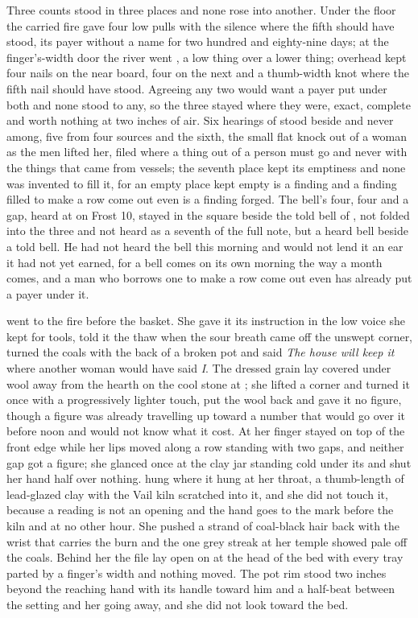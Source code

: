 Three counts stood in three places and none rose into another. Under the floor the carried fire gave four low pulls with the silence where the fifth should have stood, its payer without a name for two hundred and eighty-nine days; at the finger's-width door the river went , a low thing over a lower thing; overhead  kept four nails on the near board, four on the next and a thumb-width knot where the fifth nail should have stood. Agreeing any two would want a payer put under both and none stood to any, so the three stayed where they were, exact, complete and worth nothing at two inches of air. Six hearings of  stood beside and never among, five from four sources and the sixth, the small flat knock out of a woman as the men lifted her, filed where a thing out of a person must go and never with the things that came from vessels; the seventh place kept its emptiness and none was invented to fill it, for an empty place kept empty is a finding and a finding filled to make a row come out even is a finding forged. The bell's four, four and a gap, heard at  on Frost 10, stayed in the square beside the told bell of , not folded into the three and not heard as a seventh of the full note, but a heard bell beside a told bell. He had not heard the bell this morning and would not lend it an ear it had not yet earned, for a bell comes on its own morning the way a month comes, and a man who borrows one to make a row come out even has already put a payer under it.

 went to the fire before the basket. She gave it its instruction in the low voice she kept for tools, told it the thaw when the sour breath came off the unswept corner, turned the coals with the back of a broken pot and said \emph{The house will keep it} where another woman would have said \emph{I}. The dressed grain lay covered under wool away from the hearth on the cool stone at ; she lifted a corner and turned it once with a progressively lighter touch, put the wool back and gave it no figure, though a figure was already travelling up  toward a number that would go over it before noon and would not know what it cost. At  her finger stayed on top of the front edge while her lips moved along a row standing with two gaps, and neither gap got a figure; she glanced once at the clay jar standing cold under its  and shut her hand half over nothing.  hung where it hung at her throat, a thumb-length of lead-glazed clay with the Vail kiln scratched into it, and she did not touch it, because a reading is not an opening and the hand goes to the mark before the kiln and at no other hour. She pushed a strand of coal-black hair back with the wrist that carries the burn and the one grey streak at her temple showed pale off the coals. Behind her the file lay open on  at the head of the bed with every tray parted by a finger's width and nothing moved. The pot rim stood two inches beyond the reaching hand with its handle toward him and a half-beat between the setting and her going away, and she did not look toward the bed.


